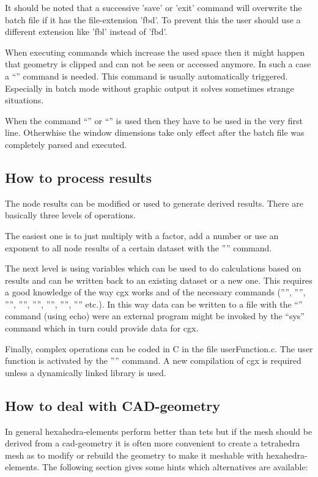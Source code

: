 \documentclass{article}
\begin{document}
\begin{appendix}
It should be noted that a successive 'save' or 'exit' command will overwrite the batch file if it has the file-extension 'fbd'. To prevent this the user should use a different extension like 'fbl' instead of 'fbd'.

When executing commands which increase the used space then it might happen that geometry is clipped and can not be seen or accessed anymore. In such a case a ``'' command is needed. This command is usually automatically triggered. Especially in batch mode without graphic output it solves sometimes strange situations.

When the command ``'' or ``'' is used then they have to be used in the very first line. Otherwhise the window dimensions take only effect after the batch file was completely parsed and executed.

\subsection{\label{How to process results}How to process results}
The node results can be modified or used to generate derived results. There are basically three levels of operations.

The easiest one is to just multiply with a factor, add a number or use an exponent to all node results of a certain dataset with the '''' command.

The next level is using variables which can be used to do calculations based on results and can be written back to an existing dataset or a new one. This requires a good knowledge of the way cgx works and of the necessary commands ('''', '''', '''', '''', '''', '''', '''', '''' etc.). In this way data can be written to a file with the ``'' command (using echo) were an external program might be invoked by the ``sys'' command which in turn could provide data for cgx.

Finally, complex operations can be coded in C in the file userFunction.c. The
user function is activated by the '''' command. A new
compilation of cgx is required unless a dynamically linked library is used.

\subsection{\label{How to deal with CAD-geometry}How to deal with CAD-geometry}
In general hexahedra-elements perform better than tets but if the mesh should be derived from a cad-geometry it is often more convenient to create a tetrahedra mesh as to modify or rebuild the geometry to make it meshable with hexahedra-elements. The following section gives some hints which alternatives are available:


\end{appendix}
\end{document}

